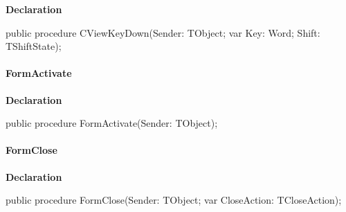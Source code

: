 \documentclass{report}
\newif\ifpdf
\begin{document}
\label{swcatalog.TSCForm-CViewKeyDown}
\begin{list}{}{
\setlength{\itemindent}{0cm}
\setlength{\listparindent}{0cm}
\setlength{\leftmargin}{\evensidemargin}
\addtolength{\leftmargin}{\tmplength}
\settowidth{\labelsep}{X}
\addtolength{\leftmargin}{\labelsep}
\setlength{\labelwidth}{\tmplength}
}
\item[\textbf{Declaration}\hfill]
\ifpdf
\begin{flushleft}
\fi
\begin{ttfamily}
public procedure CViewKeyDown(Sender: TObject; var Key: Word; Shift: TShiftState);\end{ttfamily}

\ifpdf
\end{flushleft}
\fi

\end{list}
\paragraph*{FormActivate}\hspace*{\fill}

\label{swcatalog.TSCForm-FormActivate}
\begin{list}{}{
\setlength{\itemindent}{0cm}
\setlength{\listparindent}{0cm}
\setlength{\leftmargin}{\evensidemargin}
\addtolength{\leftmargin}{\tmplength}
\settowidth{\labelsep}{X}
\addtolength{\leftmargin}{\labelsep}
\setlength{\labelwidth}{\tmplength}
}
\item[\textbf{Declaration}\hfill]
\ifpdf
\begin{flushleft}
\fi
\begin{ttfamily}
public procedure FormActivate(Sender: TObject);\end{ttfamily}

\ifpdf
\end{flushleft}
\fi

\end{list}
\paragraph*{FormClose}\hspace*{\fill}

\label{swcatalog.TSCForm-FormClose}
\begin{list}{}{
\setlength{\itemindent}{0cm}
\setlength{\listparindent}{0cm}
\setlength{\leftmargin}{\evensidemargin}
\addtolength{\leftmargin}{\tmplength}
\settowidth{\labelsep}{X}
\addtolength{\leftmargin}{\labelsep}
\setlength{\labelwidth}{\tmplength}
}
\item[\textbf{Declaration}\hfill]
\ifpdf
\begin{flushleft}
\fi
\begin{ttfamily}
public procedure FormClose(Sender: TObject; var CloseAction: TCloseAction);\end{ttfamily}

\ifpdf
\end{flushleft}
\fi

\end{list}
\end{document}
